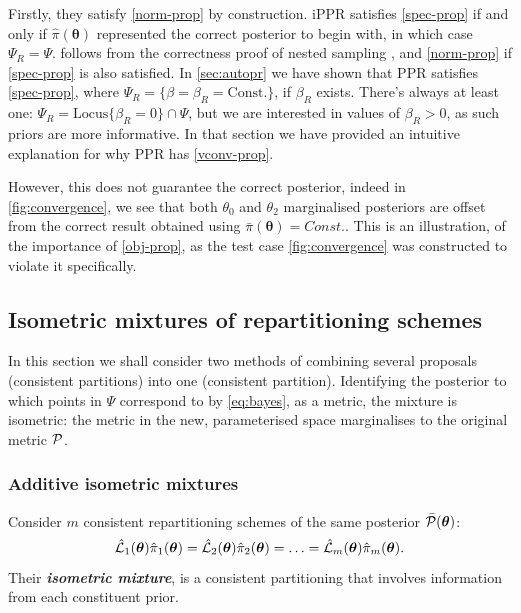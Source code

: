 \documentclass[usenatbib]{mnras}
\begin{document}
Firstly, they satisfy \cref{norm-prop} by construction. iPPR satisfies
\cref{spec-prop} if and only if \( \hat{\pi} (\bm{\theta})\)
represented the correct posterior to begin with, in which case
$\Psi_{R} = \Psi$.  follows from the correctness
proof of nested sampling \citep{Skilling2006}, and \cref{norm-prop} if
\cref{spec-prop} is also satisfied. In \cref{sec:autopr} we have shown
that PPR satisfies \cref{spec-prop}, where
$\Psi_{R} = \{ \beta = \beta_{R} = \text{Const.}\}$, if $\beta_{R}$
exists. There's always at least one:
$\Psi_{R} = \text{Locus}\{ \beta_{R}=0 \} \cap \Psi$, but we are
interested in values of $\beta_{R} > 0$, as such priors are more
informative. In that section we have provided an intuitive explanation
for why PPR has \cref{vconv-prop}.

However, this does not guarantee the correct posterior, indeed in
\cref{fig:convergence}, we see that both $\theta_{0}$ and $\theta_{2}$
marginalised posteriors are offset from the correct result obtained
using $\bar{\pi}(\bm{\theta})=Const.$. This is an illustration, of the
importance of \cref{obj-prop}, as the test case \cref{fig:convergence}
was constructed to violate it specifically.


\subsection{Isometric mixtures of repartitioning schemes\label{sec:isomixtures}}
In this section we shall consider two methods of combining several
proposals (consistent partitions) into one (consistent
partition). Identifying the posterior to which points in $\Psi$
correspond to by \cref{eq:bayes}, as a metric, the mixture is
isometric: the metric in the new, parameterised space marginalises to
the original metric ${\cal P}$.


\subsubsection{Additive isometric mixtures}\label{sec:org418133f}
Consider \(m\) consistent repartitioning schemes of the same
posterior \(\bar{\cal P}(\bm{\theta})\):
\begin{equation}
  \label{eq:collection-of-models}
  \hat{\cal L}_{1}(\bm{\theta}) \hat{\pi}_{1}(\bm{\theta}) = \hat{\cal L}_{2}(\bm{\theta}) \hat{\pi}_{2}(\bm{\theta})= \ldots =\hat{\cal L}_{m}(\bm{\theta}) \hat{\pi}_{m}(\bm{\theta}). 
\end{equation}
Their \textbf{\textbf{\emph{isometric mixture}}}, is a consistent
partitioning that involves information from each constituent prior.
\end{document}
